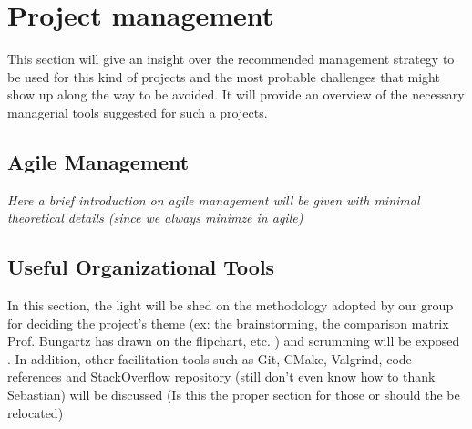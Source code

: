 \section{Project management}
This section will give an insight over the recommended management strategy to be used for this kind of projects and the most probable challenges that might show up along the way to be avoided. It will provide an overview of the necessary managerial tools suggested for such a projects.


\subsection{Agile Management}
\textit{Here a brief introduction on agile management will be given with minimal theoretical details (since we always minimze in agile)}


\subsection{Useful Organizational Tools}
In this section, the light will be shed on the methodology adopted by our group for deciding the project's theme (ex: the brainstorming, the comparison matrix Prof. Bungartz has drawn on the flipchart, etc. ) and scrumming will be exposed . In addition, other facilitation tools such as Git, CMake, Valgrind, code references and StackOverflow repository (still don't even know how to thank Sebastian) will be discussed (Is this the proper section for those or should the be relocated)
